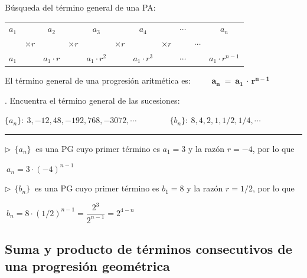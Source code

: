 \vspace{4mm} Búsqueda del término general de una PA:
\begin{table}[H]
\centering
\begin{tabular}{ccccccccccc}
$a_1$ &  & $a_2$ &  & $a_3$ &  & $a_4$ & &$\cdots$ &  & $a_n$ \\
 & $\times r$ &  & $\times r$ &  & $\times r$ & & $\times r$ &  & $\cdots$ &   \\
$a_1$ &  & $a_1\cdot r$ &  & $a_1 \cdot r^2$ &  & $a_1 \cdot r^3$ &  &$\cdots$ & & $a_1 \cdot r^{n-1}$
\end{tabular}
\end{table}

\begin{definition}

El término general de una progresión aritmética es: 
$\qquad \boxed{ \ 	\boldsymbol{ a_n  \ =  \  a_1 \, \cdot \,   r^{ n - 1 }   } \ }$	
\end{definition}


\begin{miejercicio}
	. Encuentra el término general de las sucesiones:

\vspace{2mm} $\{a_n\}:\ 3, -12 , 48, -192 , 768 , -3072, \cdots  \qquad  \qquad \{b_n\}:\  8, 4, 2, 1 , 1/2 , 1/4 , \cdots$
	
\rule{250pt}{0.1pt}

\vspace{2mm}
$\triangleright \ \ \{a_n\}\ $ es una PG cuyo primer término es $a_1=3$ y la razón $r=-4$, por lo que 

\vspace{2mm} $\ a_n=3\cdot (-4)^{n-1}$

\vspace{5mm}
$\triangleright \ \ \{b_n\}\ $ es una PG cuyo primer término es $b_1=8$ y la razón $r=1/2$, por lo que 

\vspace{2mm} $\ b_n=8\cdot (1/2)^{n-1}=\dfrac{2^3}{2^{n-1}}=2^{4-n}$

\end{miejercicio}

\vspace{5mm}
\subsection{Suma y producto de términos consecutivos de una progresión geométrica}
\vspace{0.5cm}


